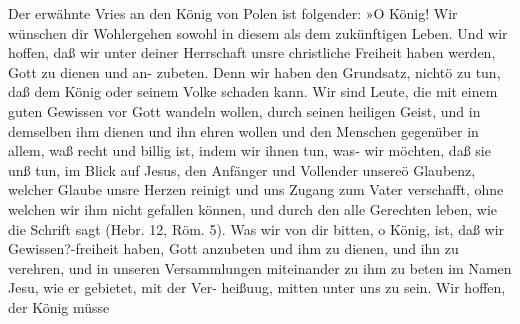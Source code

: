 

Der erwähnte Vries an den König von Polen ist folgender:
»O König!
Wir wünschen dir Wohlergehen sowohl in diesem als dem
zukünftigen Leben. Und wir hoffen, daß wir unter deiner Herrschaft
unsre christliche Freiheit haben werden, Gott zu dienen und an-
zubeten. Denn wir haben den Grundsatz, nichtö zu tun, daß dem
König oder seinem Volke schaden kann. Wir sind Leute, die mit
einem guten Gewissen vor Gott wandeln wollen, durch seinen
heiligen Geist, und in demselben ihm dienen und ihn ehren wollen
und den Menschen gegenüber in allem, waß recht und billig ist,
indem wir ihnen tun, was- wir möchten, daß sie unß tun, im
Blick auf Jesus, den Anfänger und Vollender unsereö Glaubenz,
welcher Glaube unsre Herzen reinigt und uns Zugang zum
Vater verschafft, ohne welchen wir ihm nicht gefallen können,
und durch den alle Gerechten leben, wie die Schrift sagt (Hebr.
12, Röm. 5). Was wir von dir bitten, o König, ist, daß wir
Gewissen?-freiheit haben, Gott anzubeten und ihm zu dienen, und
ihn zu verehren, und in unseren Versammlungen miteinander zu
ihm zu beten im Namen Jesu, wie er gebietet, mit der Ver-
heißuug, mitten unter uns zu sein. Wir hoffen, der König müsse


